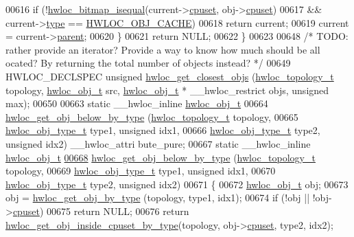 \begin{DoxyCode}
00616     \textcolor{keywordflow}{if} (!\hyperlink{a00065_ga4dd6a75ab63d33ef33bd626b0e489388}{hwloc_bitmap_isequal}(current->\hyperlink{a00016_a67925e0f2c47f50408fbdb9bddd0790f}{cpuset}, obj->\hyperlink{a00016_a67925e0f2c47f50408fbdb9bddd0790f}{cpuset})
00617         && current->\hyperlink{a00016_acc4f0803f244867e68fe0036800be5de}{type} == \hyperlink{a00041_ggacd37bb612667dc437d66bfb175a8dc55a56ee0b7eca88f363b75b34fdde8c9ddc}{HWLOC_OBJ_CACHE})
00618       \textcolor{keywordflow}{return} current;
00619     current = current->\hyperlink{a00016_adc494f6aed939992be1c55cca5822900}{parent};
00620   \}
00621   \textcolor{keywordflow}{return} NULL;
00622 \}
00623 
00648 \textcolor{comment}{/* TODO: rather provide an iterator? Provide a way to know how much should be all
      ocated? By returning the total number of objects instead? */}
00649 HWLOC\_DECLSPEC \textcolor{keywordtype}{unsigned} \hyperlink{a00058_ga26c2ac4f25b1ed293249c88e232f1bea}{hwloc_get_closest_objs} (\hyperlink{a00039_ga9d1e76ee15a7dee158b786c30b6a6e38}{hwloc_topology_t} topology, 
      \hyperlink{a00016}{hwloc_obj_t} src, \hyperlink{a00016}{hwloc_obj_t} * \_\_hwloc\_restrict objs, \textcolor{keywordtype}{unsigned} max);
00650 
00663 \textcolor{keyword}{static} \_\_hwloc\_inline \hyperlink{a00016}{hwloc_obj_t}
00664 \hyperlink{a00058_ga6c482c2097f01b1ff88598fec8a1ba3b}{hwloc_get_obj_below_by_type} (\hyperlink{a00039_ga9d1e76ee15a7dee158b786c30b6a6e38}{hwloc_topology_t} topology,
00665                              \hyperlink{a00041_gacd37bb612667dc437d66bfb175a8dc55}{hwloc_obj_type_t} type1, \textcolor{keywordtype}{unsigned} idx1,
00666                              \hyperlink{a00041_gacd37bb612667dc437d66bfb175a8dc55}{hwloc_obj_type_t} type2, \textcolor{keywordtype}{unsigned} idx2) \_\_hwloc\_attri
      bute\_pure;
00667 \textcolor{keyword}{static} \_\_hwloc\_inline \hyperlink{a00016}{hwloc_obj_t}
\hypertarget{a00031_source_l00668}{}\hyperlink{a00058_ga6c482c2097f01b1ff88598fec8a1ba3b}{00668} \hyperlink{a00058_ga6c482c2097f01b1ff88598fec8a1ba3b}{hwloc_get_obj_below_by_type} (\hyperlink{a00039_ga9d1e76ee15a7dee158b786c30b6a6e38}{hwloc_topology_t} topology,
00669                              \hyperlink{a00041_gacd37bb612667dc437d66bfb175a8dc55}{hwloc_obj_type_t} type1, \textcolor{keywordtype}{unsigned} idx1,
00670                              \hyperlink{a00041_gacd37bb612667dc437d66bfb175a8dc55}{hwloc_obj_type_t} type2, \textcolor{keywordtype}{unsigned} idx2)
00671 \{
00672   \hyperlink{a00016}{hwloc_obj_t} obj;
00673   obj = \hyperlink{a00047_ga9be4a03488cdd0fb431e4aa1cbdea895}{hwloc_get_obj_by_type} (topology, type1, idx1);
00674   \textcolor{keywordflow}{if} (!obj || !obj->\hyperlink{a00016_a67925e0f2c47f50408fbdb9bddd0790f}{cpuset})
00675     \textcolor{keywordflow}{return} NULL;
00676   \textcolor{keywordflow}{return} \hyperlink{a00054_gaa8dcdb85224f7350b90fb0a1ca91e6d6}{hwloc_get_obj_inside_cpuset_by_type}(topology, obj->\hyperlink{a00016_a67925e0f2c47f50408fbdb9bddd0790f}{cpuset}, type2, idx2);
      

\end{DoxyCode}
